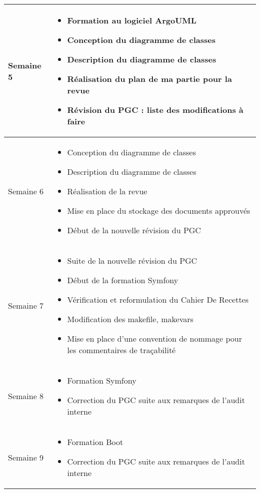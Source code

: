 \documentclass [a4paper] {article}
\begin{document}
\section*{\Mathieu}

\begin{tabularx}{16.8cm}{|>{\columncolor{gray!40}}l|X|}
	\hline
	Semaine 5 & 
	\begin{itemize}
		\item Formation au logiciel ArgoUML
		\item Conception du diagramme de classes
		\item Description du diagramme de classes
		\item Réalisation du plan de ma partie pour la revue
		\item Révision du PGC : liste des modifications à faire
	\end{itemize} \\
	\hline
	Semaine 6 & 
	\begin{itemize}
		\item Conception du diagramme de classes
		\item Description du diagramme de classes
		\item Réalisation de la revue
		\item Mise en place du stockage des documents approuvés
		\item Début de la nouvelle révision du PGC
	\end{itemize} \\
	\hline
	Semaine 7 & 
	\begin{itemize}
		\item Suite de la nouvelle révision du PGC
		\item Début de la formation Symfony
		\item Vérification et reformulation du Cahier De Recettes
		\item Modification des makefile, makevars
		\item Mise en place d'une convention de nommage pour les commentaires de traçabilité
	\end{itemize} \\
	\hline	
	Semaine 8 & 
	\begin{itemize}
		\item Formation Symfony
		\item Correction du PGC suite aux remarques de l'audit interne
	\end{itemize} \\
	\hline
	Semaine 9 & 
	\begin{itemize}
		\item Formation Boot
		\item Correction du PGC suite aux remarques de l'audit interne
	\end{itemize} \\
	\hline
\end{tabularx}
\end{document}
